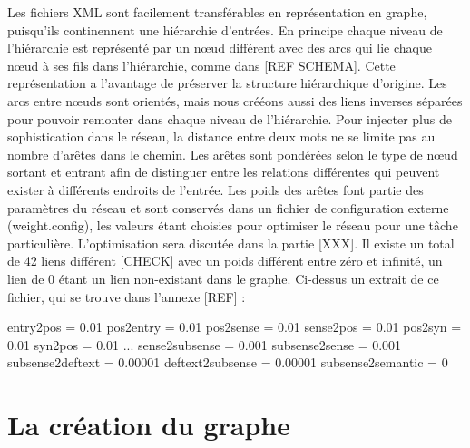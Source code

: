 \documentclass{article}
\begin{document}
Les fichiers XML sont facilement transférables en représentation en graphe, puisqu'ils continennent une hiérarchie d'entrées. En principe chaque niveau de l'hiérarchie est représenté par un nœud différent avec des arcs qui lie chaque nœud à ses fils dans l'hiérarchie, comme dans [REF SCHEMA]. Cette représentation a l'avantage de préserver la structure hiérarchique d'origine.
\newline
\newline
Les arcs entre nœuds sont orientés, mais nous crééons aussi des liens inverses séparées pour pouvoir remonter dans chaque niveau de l'hiérarchie. Pour injecter plus de sophistication dans le réseau, la distance entre deux mots ne se limite pas au nombre d'arêtes dans le chemin. Les arêtes sont pondérées selon le type de nœud sortant et entrant afin de distinguer entre les relations différentes qui peuvent exister à différents endroits de l'entrée. Les poids des arêtes font partie des paramètres du réseau et sont conservés dans un fichier de configuration externe (weight.config), les valeurs étant choisies pour optimiser le réseau pour une tâche particulière. L'optimisation sera discutée dans la partie [XXX]. Il existe un total de 42 liens différent [CHECK] avec un poids différent entre zéro et infinité, un lien de 0 étant un lien non-existant dans le graphe. Ci-dessus un extrait de ce fichier, qui se trouve dans l'annexe [REF] :

\begin{framed}
entry2pos = 0.01\newline
pos2entry = 0.01\newline
pos2sense = 0.01\newline
sense2pos = 0.01\newline
pos2syn = 0.01\newline
syn2pos = 0.01\newline
...\newline
sense2subsense = 0.001\newline
subsense2sense = 0.001\newline
subsense2deftext = 0.00001\newline
deftext2subsense = 0.00001\newline
subsense2semantic = 0\newline
\end{framed}

\section{La création du graphe}
\end{document}
